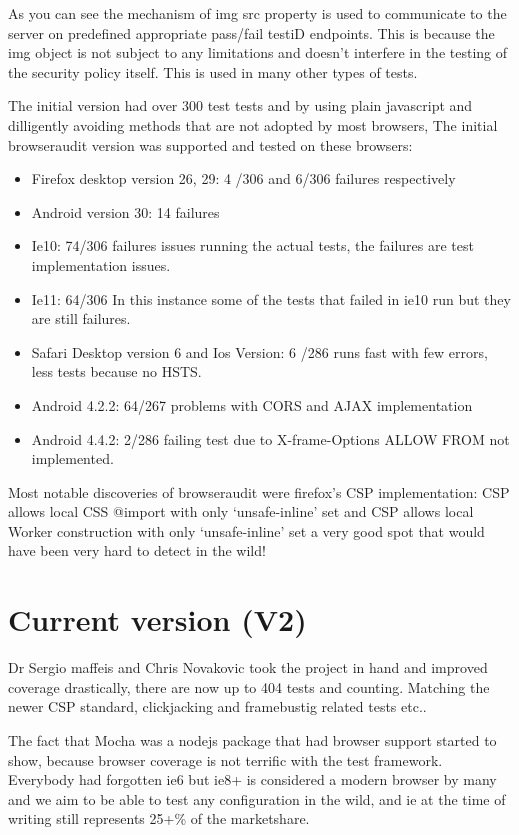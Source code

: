 As you can see the mechanism of img src property is used to communicate to the server on predefined appropriate pass/fail testiD endpoints. This is because 
the img object is not subject to any limitations and doesn't interfere in the testing of the security policy itself. This is used in many other types of tests.

The initial version had over 300 test tests and by using plain javascript and dilligently avoiding methods that are not adopted by most browsers,
The initial browseraudit version was supported and tested on these browsers:

\begin{itemize}
 \item Firefox desktop version 26, 29:  4 /306 and 6/306 failures respectively
 \item Android version 30: 14 failures
 \item Ie10: 74/306 failures issues running the actual tests, the failures are test implementation issues.
 \item Ie11: 64/306 In this instance some of the tests that failed in ie10 run but they are still failures.
 \item Safari Desktop version 6 and Ios Version: 6 /286 runs fast with few errors, less tests because no HSTS.
 \item Android 4.2.2: 64/267 problems with CORS and AJAX implementation
 \item Android 4.4.2: 2/286 failing test due to X-frame-Options ALLOW FROM not implemented.
\end{itemize}

Most notable discoveries of browseraudit were firefox's CSP implementation: CSP allows local CSS @import with only `unsafe-inline' set and 
CSP allows local Worker construction with only `unsafe-inline' set a very good spot that would have been very hard to detect in the wild!

\section{Current version (V2)}

Dr Sergio maffeis and Chris Novakovic took the project in hand and improved coverage drastically, there are now up to 404 tests and counting.
Matching the newer CSP standard, clickjacking and framebustig related tests etc..

The fact that Mocha was a nodejs package that had browser support started to show, because browser coverage is not terrific with the test framework.
Everybody had forgotten ie6 but ie8+ is considered a modern browser by many and we aim to be able to test any configuration in the wild, and ie at the time
of writing still represents 25+\% of the marketshare.\

